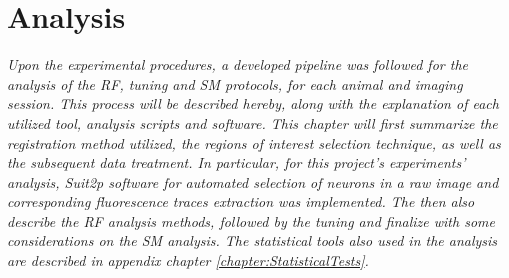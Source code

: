 
\chapter{Analysis}
\label{cap:Analysis}

\textit{Upon the experimental procedures, a developed pipeline was followed for the analysis of the RF, tuning and SM protocols, for each animal and imaging session. This process will be described hereby, along with the explanation of each utilized tool, analysis scripts and software. This chapter will first summarize the registration method utilized, the regions of interest selection technique, as well as the subsequent data treatment. In particular, for this project's experiments' analysis, Suit2p software for automated selection of neurons in a raw image and corresponding fluorescence traces extraction was implemented. The then also describe the RF analysis methods, followed by the tuning and finalize with some considerations on the SM analysis.
The statistical tools also used in the analysis are described in appendix chapter \ref{chapter:StatisticalTests}. }





%
